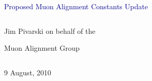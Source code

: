 \documentclass[compress]{beamer}
\begin{document}
\begin{frame}
\vfill
\begin{center}
\textcolor{darkblue}{\Large Proposed Muon Alignment Constants Update}

\vfill
\begin{columns}
\begin{center}
\large
Jim Pivarski on behalf of the

Muon Alignment Group
\end{center}
\end{columns}

\vfill
 9 August, 2010

\end{center}
\end{frame}


\small
\end{document}
